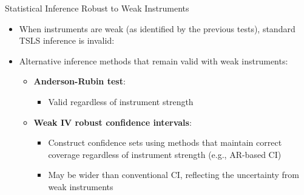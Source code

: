 \documentclass[dvipsnames,hyperref={pdfpagelabels=false}]{beamer}
\begin{document}
\begin{frame}{Statistical Inference Robust to Weak Instruments}
	\begin{itemize}
		\item When instruments are weak (as identified by the previous tests), standard TSLS inference is invalid:
		\vspace{0.3cm}
		\item Alternative inference methods that remain valid with weak instruments:
		\begin{itemize}
			\vspace{0.2cm}
			\item \textbf{Anderson-Rubin test}:
			\vspace{0.2cm}
			\begin{itemize}
				\item Valid regardless of instrument strength
			\end{itemize}
			\vspace{0.2cm}
			\item \textbf{Weak IV robust confidence intervals}:
			\vspace{0.2cm}
			\begin{itemize}
				\item Construct confidence sets using methods that maintain correct coverage regardless of instrument strength (e.g., AR-based CI)
							\vspace{0.2cm}
				\item May be wider than conventional CI, reflecting the uncertainty from weak instruments
			\end{itemize}
		\end{itemize}
	\end{itemize}
\end{frame}
\end{document}
